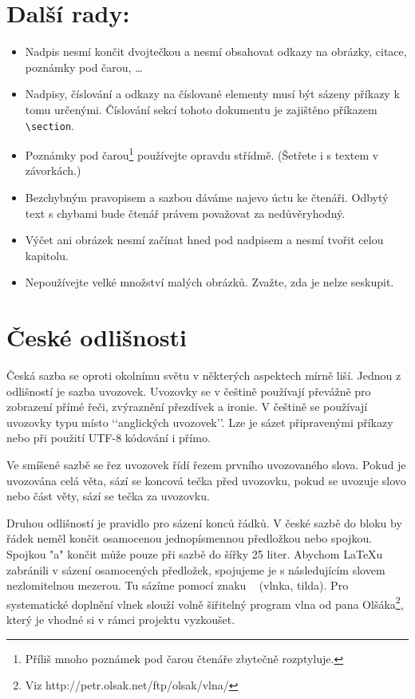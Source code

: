 \documentclass[10pt, a4paper, twocolumn]{article}
\begin{document}
\section{Další rady:}
\begin{itemize}
    \item Nadpis nesmí končit dvojtečkou a nesmí obsahovat odkazy na obrázky, citace, poznámky pod čarou, \ldots
    \item Nadpisy, číslování a odkazy na číslované elementy musí být sázeny příkazy k tomu určenými.
    Číslování sekcí tohoto dokumentu je zajištěno příkazem \verb|\section|.
    \item Poznámky pod čarou\footnote[1]{Příliš mnoho poznámek pod čarou čtenáře zbytečně rozptyluje.} používejte opravdu střídmě.
    (Šetřete i s textem v závorkách.)
    \item Bezchybným pravopisem a sazbou dáváme najevo úctu ke čtenáři.
    Odbytý text s chybami bude čtenář právem považovat za nedůvěryhodný.
    \item Výčet ani obrázek nesmí začínat hned pod nadpisem a nesmí tvořit celou kapitolu.
    \item Nepoužívejte velké množství malých obrázků.
    Zvažte, zda je nelze seskupit.
\end{itemize}










\section{České odlišnosti}

Česká sazba se oproti okolnímu světu v některých aspektech mírně liší.
Jednou z odlišností je sazba uvozovek.
Uvozovky se v češtině používají převážně pro zobrazení přímé řeči, zvýraznění přezdívek a ironie.
V češtině se používají uvozovky typu  místo ‘‘anglických uvozovek’’.
Lze je sázet připravenými příkazy nebo při použití UTF-8 kódování i přímo.

Ve smíšené sazbě se řez uvozovek řídí řezem prvního uvozovaného slova.
Pokud je uvozována celá věta, sází se koncová tečka před uvozovku, pokud se uvozuje slovo nebo část věty, sází se tečka za uvozovku.

Druhou odlišností je pravidlo pro sázení konců řádků.
V české sazbě do bloku by řádek neměl končit osamocenou jednopísmennou předložkou nebo spojkou.
Spojkou "a" končit může pouze při sazbě do šířky 25 liter.
Abychom LaTeXu zabránili v sázení osamocených předložek, spojujeme je s následujícím slovem nezlomitelnou mezerou.
Tu sázíme pomocí znaku ~ (vlnka, tilda).
Pro systematické doplnění vlnek slouží volně šiřitelný program vlna od pana Olšáka\footnote[2]{Viz http://petr.olsak.net/ftp/olsak/vlna/}, který je vhodné si v rámci projektu vyzkoušet.
\end{document}
